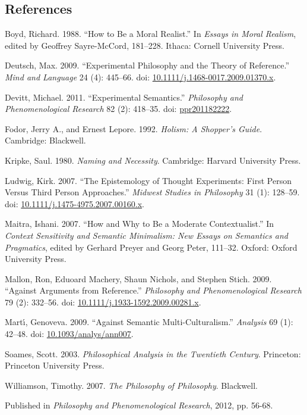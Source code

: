 \documentclass[
  11pt,
  letterpaper,
  DIV=11,
  numbers=noendperiod,
  twoside]{scrartcl}
\newlength{\cslhangindent}
\newenvironment{CSLReferences}[2] %
 {\begin{list}{}{%
  \setlength{\itemindent}{0pt}
  \setlength{\leftmargin}{0pt}
  \setlength{\parsep}{0pt}
  \ifodd #1
   \setlength{\leftmargin}{\cslhangindent}
   \setlength{\itemindent}{-1\cslhangindent}
  \fi
  \setlength{\itemsep}{#2\baselineskip}}}
 {\end{list}}
\begin{document}
\subsection*{References}\label{references}

\label{refs}
\begin{CSLReferences}{1}{0}
Boyd, Richard. 1988. {``How to Be a Moral Realist.''} In \emph{Essays in
Moral Realism}, edited by Geoffrey Sayre-McCord, 181--228. Ithaca:
Cornell University Press.

Deutsch, Max. 2009. {``Experimental Philosophy and the Theory of
Reference.''} \emph{Mind and Language} 24 (4): 445--66. doi:
\href{https://doi.org/10.1111/j.1468-0017.2009.01370.x}{10.1111/j.1468-0017.2009.01370.x}.

Devitt, Michael. 2011. {``Experimental Semantics.''} \emph{Philosophy
and Phenomenological Research} 82 (2): 418--35. doi:
\href{https://doi.org/ppr201182222}{ppr201182222}.

Fodor, Jerry A., and Ernest Lepore. 1992. \emph{Holism: A Shopper's
Guide}. Cambridge: Blackwell.

Kripke, Saul. 1980. \emph{Naming and Necessity}. Cambridge: Harvard
University Press.

Ludwig, Kirk. 2007. {``The Epistemology of Thought Experiments: First
Person Versus Third Person Approaches.''} \emph{Midwest Studies in
Philosophy} 31 (1): 128--59. doi:
\href{https://doi.org/10.1111/j.1475-4975.2007.00160.x}{10.1111/j.1475-4975.2007.00160.x}.

Maitra, Ishani. 2007. {``How and Why to Be a Moderate Contextualist.''}
In \emph{Context Sensitivity and Semantic Minimalism: New Essays on
Semantics and Pragmatics}, edited by Gerhard Preyer and Georg Peter,
111--32. Oxford: Oxford University Press.

Mallon, Ron, Eduoard Machery, Shaun Nichols, and Stephen Stich. 2009.
{``Against Arguments from Reference.''} \emph{Philosophy and
Phenomenological Research} 79 (2): 332--56. doi:
\href{https://doi.org/10.1111/j.1933-1592.2009.00281.x}{10.1111/j.1933-1592.2009.00281.x}.

Martı́, Genoveva. 2009. {``Against Semantic Multi-Culturalism.''}
\emph{Analysis} 69 (1): 42--48. doi:
\href{https://doi.org/10.1093/analys/ann007}{10.1093/analys/ann007}.

Soames, Scott. 2003. \emph{Philosophical Analysis in the Twentieth
Century}. Princeton: Princeton University Press.

Williamson, Timothy. 2007. \emph{{The Philosophy of Philosophy}}.
Blackwell.

\end{CSLReferences}



\noindent Published in\emph{
Philosophy and Phenomenological Research}, 2012, pp. 56-68.
\end{document}
